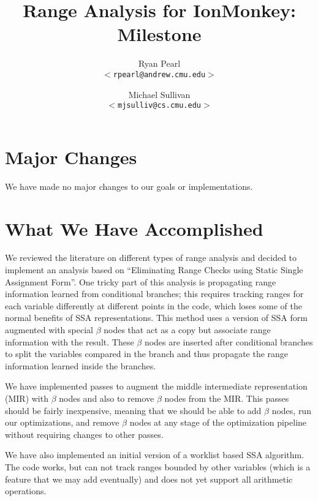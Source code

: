 \documentclass{article}
\begin{document}
\title{\bf Range Analysis for IonMonkey: Milestone}

\author{
Ryan Pearl\\
\texttt{$<$rpearl@andrew.cmu.edu$>$}\\
\and
Michael Sullivan\\
\texttt{$<$mjsulliv@cs.cmu.edu$>$}\\
}

\maketitle

\section{Major Changes}
We have made no major changes to our goals or implementations.


\section{What We Have Accomplished}
We reviewed the literature on different types of range analysis and
decided to implement an analysis based on ``Eliminating Range Checks
using Static Single Assignment Form''. 
One tricky part of this analysis is propagating range information
learned from conditional branches; this requires tracking ranges for
each variable differently at different points in the code, which loses
some of the normal benefits of SSA representations.
This method uses a version of
SSA form augmented with special $\beta$ nodes that act as a copy but
associate range information with the result. These $\beta$ nodes are
inserted after conditional branches to split the variables compared in
the branch and thus propagate the range information learned inside the
branches.

We have implemented passes to augment the middle intermediate
representation (MIR) with $\beta$ nodes and also to remove $\beta$
nodes from the MIR. This passes should be fairly inexpensive, meaning
that we should be able to add $\beta$ nodes, run our optimizations,
and remove $\beta$ nodes at any stage of the optimization pipeline
without requiring changes to other passes.

We have also implemented an initial version of a worklist based SSA
algorithm. The code works, but can not track ranges bounded by other
variables (which is a feature that we may add eventually) and does not yet
support all arithmetic operations.
\end{document}
